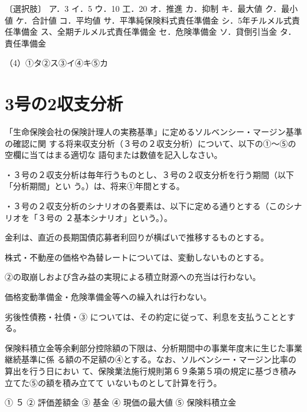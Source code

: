 \documentclass[report,gutter=10mm,fore-edge=10mm,uplatex,dvipdfmx]{jlreq}
\begin{document}
〔選択肢〕
ア．3
イ．5
ウ．10
工．20
オ．推進
カ．抑制
キ．最大値
ク．最小値
ケ．合計値
コ．平均値
サ．平準純保険料式責任準備金
シ．5年チルメル式責任準備金
ス、全期チルメル式責任準備金
セ．危険準備金
ソ．貸倒引当金
タ．責任準備金

\answer{}
（4）①タ②ス③イ④キ⑤カ

\section{3号の2収支分析}
「生命保険会社の保険計理人の実務基準」に定めるソルベンシー・マージン基準の確認に関
する将来収支分析（３号の２収支分析）について、以下の①～⑤の空欄に当てはまる適切な
語句または数値を記入しなさい。

・３号の２収支分析は毎年行うものとし、３号の２収支分析を行う期間（以下「分析期間」とい
う。）は、将来①年間とする。

・３号の２収支分析のシナリオの各要素は、以下に定める通りとする（このシナリオを「３号の
２基本シナリオ」という。）。

 金利は、直近の長期国債応募者利回りが横ばいで推移するものとする。

 株式・不動産の価格や為替レートについては、変動しないものとする。

②の取崩しおよび含み益の実現による積立財源への充当は行わない。

 価格変動準備金・危険準備金等への繰入れは行わない。

 劣後性債務・社債・③
については、その約定に従って、利息を支払うこととする。

保険料積立金等余剰部分控除額の下限は、分析期間中の事業年度末に生じた事業継続基準に係
る額の不足額の④とする。なお、ソルベンシー・マージン比率の算出を行う日におい
て、保険業法施行規則第６９条第５項の規定に基づき積み立てた⑤の額を積み立てて
いないものとして計算を行う。

\answer{}
① ５ ② 評価差額金 
③ 基金 
④ 現価の最大値 ⑤ 保険料積立金 
\end{document}
